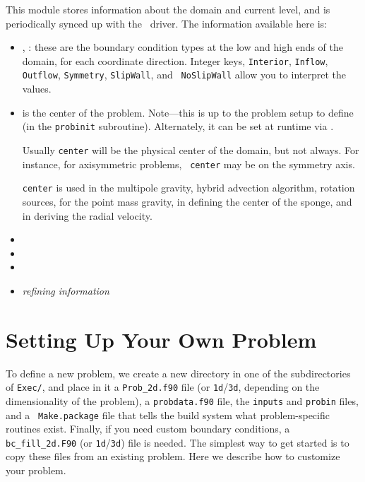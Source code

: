 \begin{itemize}
  \label{soft:prob_params}

  This module stores information about the domain and current level,
  and is periodically synced up with the \cpp\ driver.  The information
  available here is:
  \begin{itemize}
  \item {}, : these are the boundary
    condition types at the low and high ends of the domain, for each
    coordinate direction.  Integer keys, {\tt Interior}, {\tt Inflow},
    {\tt Outflow}, {\tt Symmetry}, {\tt SlipWall}, and {\tt
      NoSlipWall} allow you to interpret the values.

  \item {} is the center of the problem.  Note---this is up
    to the problem setup to define (in the {\tt probinit} subroutine).
    Alternately, it can be set at runtime via
    . 

    Usually {\tt center} will be the physical center of the domain,
    but not always.  For instance, for axisymmetric problems, {\tt
      center} may be on the symmetry axis.

    {\tt center} is used in the multipole gravity, hybrid advection
    algorithm, rotation sources, for the point mass gravity, in
    defining the center of the sponge, and in deriving the radial
    velocity.  

  \item {}

  \item {}

  \item {}

  \item {\em refining information}

  \end{itemize}

\end{itemize}



\section{Setting Up Your Own Problem}

To define a new problem, we create a new directory in one
of the subdirectories of {\tt Exec/},
and place in it a {\tt Prob\_2d.f90} file (or {\tt 1d}/{\tt 3d},
depending on the dimensionality of the problem), a {\tt probdata.f90}
file, the {\tt inputs} and {\tt probin} files, and a {\tt
  Make.package} file that tells the build system what problem-specific
routines exist.  Finally, if you need custom boundary conditions, a
{\tt bc\_fill\_2d.F90} (or {\tt 1d}/{\tt 3d}) file is needed.  The
simplest way to get started is to copy these files from an existing
problem.  Here we describe how to customize your problem.

